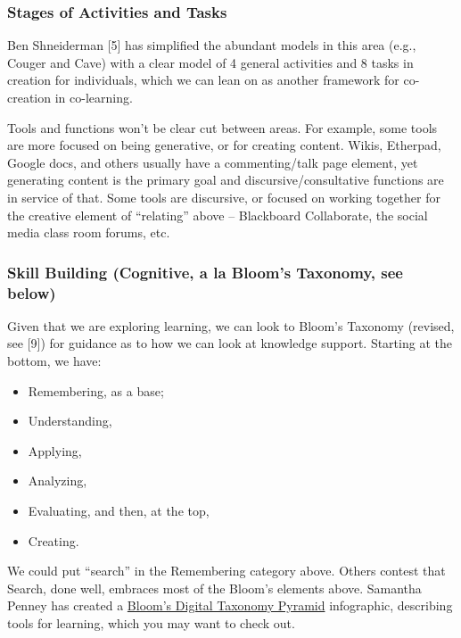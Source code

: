 \subsubsection{Stages of Activities and
Tasks}\label{stages-of-activities-and-tasks}

Ben Shneiderman {{[}5{]}} has simplified the abundant models in this
area (e.g., Couger and Cave) with a clear model of 4 general activities
and 8 tasks in creation for individuals, which we can lean on as another
framework for co-creation in co-learning.

Tools and functions won't be clear cut between areas. For example, some
tools are more focused on being generative, or for creating content.
Wikis, Etherpad, Google docs, and others usually have a commenting/talk
page element, yet generating content is the primary goal and
discursive/consultative functions are in service of that. Some tools are
discursive, or focused on working together for the creative element of
``relating'' above -- Blackboard Collaborate, the social media class
room forums, etc.

\subsubsection{Skill Building (Cognitive, a la Bloom's Taxonomy, see
below)}\label{skill-building-cognitive-a-la-blooms-taxonomy-see-below}

Given that we are exploring learning, we can look to Bloom's Taxonomy
(revised, see {{[}9{]}}) for guidance as to how we can look at knowledge
support. Starting at the bottom, we have:

\begin{itemize}
\itemsep1pt\parskip0pt
\item
  Remembering, as a base;
\item
  Understanding,
\item
  Applying,
\item
  Analyzing,
\item
  Evaluating, and then, at the top,
\item
  Creating.
\end{itemize}

We could put ``search'' in the Remembering category above. Others
contest that Search, done well, embraces most of the Bloom's elements
above. Samantha Penney has created a
\href{http://www.usi.edu/distance/bdt.htm}{Bloom's Digital Taxonomy
Pyramid} infographic, describing tools for learning, which you may want
to check out.


